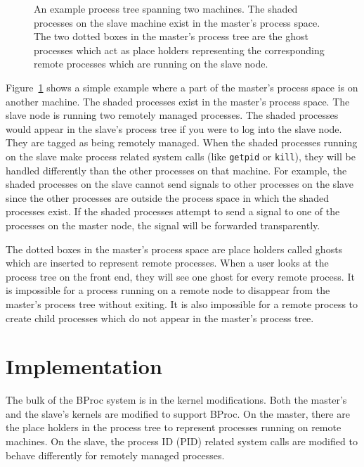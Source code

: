 \begin{figure}
\begin{center}
\epsfysize=1.5in

\caption{An example process tree spanning two machines.  The shaded
processes on the slave machine exist in the master's process space.
The two dotted boxes in the master's process tree are the ghost
processes which act as place holders representing the corresponding
remote processes which are running on the slave node.}

\label{fig:ptree}
\end{center}
\end{figure}

Figure~\ref{fig:ptree} shows a simple example where a part of the
master's process space is on another machine.  The shaded processes
exist in the master's process space.  The slave node is running two
remotely managed processes.  The shaded processes would appear in the
slave's process tree if you were to log into the slave node.  They are
tagged as being remotely managed.  When the shaded processes running
on the slave make process related system calls (like \texttt{getpid}
or \texttt{kill}), they will be handled differently than the other
processes on that machine.  For example, the shaded processes on the
slave cannot send signals to other processes on the slave since the
other processes are outside the process space in which the shaded
processes exist.  If the shaded processes attempt to send a signal to
one of the processes on the master node, the signal will be
forwarded transparently.

The dotted boxes in the master's process space are place holders
called ghosts which are inserted to represent remote processes.  When
a user looks at the process tree on the front end, they will see one
ghost for every remote process.  It is impossible for a process
running on a remote node to disappear from the master's process tree
without exiting.  It is also impossible for a remote process to create
child processes which do not appear in the master's process tree.

\section{Implementation}


The bulk of the BProc system is in the kernel modifications.  Both the
master's and the slave's kernels are modified to support BProc.  On
the master, there are the place holders in the process tree to
represent processes running on remote machines.  On the slave, the
process ID (PID) related system calls are modified to behave
differently for remotely managed processes.

